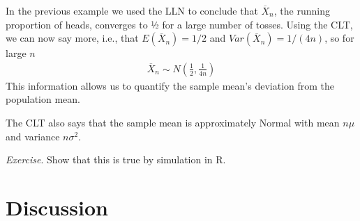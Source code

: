 In the previous example we used the LLN to conclude that \({\overline{X}}_{n}\), 
the running proportion of heads, 
converges to ½ for a large number of tosses. 
Using the CLT, 
we can now say more, i.e.,
that \(E\left( {\overline{X}}_{n} \right) = 1/2\) and
\(Var\left( {\overline{X}}_{n} \right) = 1/(4n)\), so for large \(n\)
\begin{align}
{\overline{X}}_{n} \sim N\left( \frac{1}{2},\frac{1}{4n} \right)
\end{align}
This information allows us to quantify the sample mean's deviation from the population mean.

The CLT also says that the sample mean is approximately Normal with mean
\(n\mu\) and variance \(n\sigma^{2}\). 

\emph{Exercise}. 
Show that this is true by simulation in R.

\newpage
\section{Discussion}

